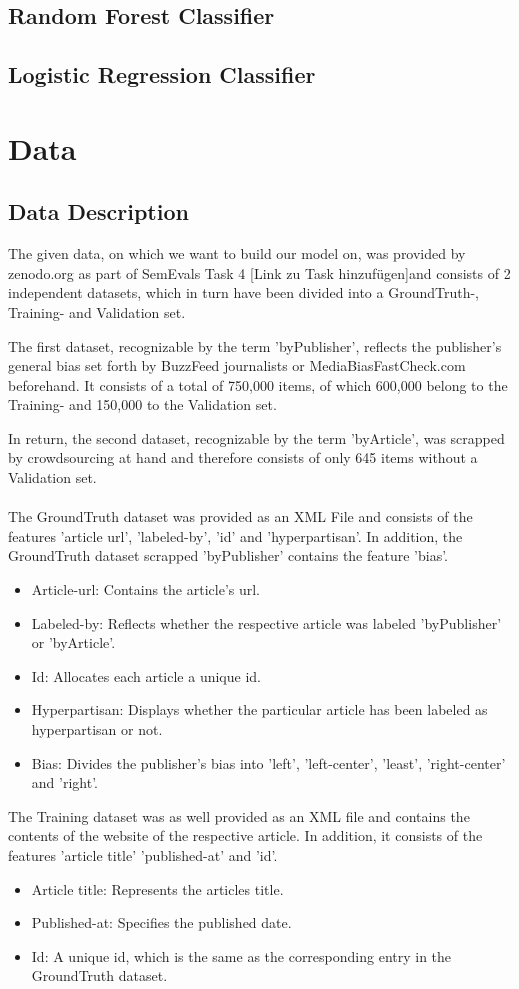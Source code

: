 \documentclass[a4paper, 11pt,titlepage,oneside,openany]{book}
\begin{document}
\section{Random Forest Classifier}
\section{Logistic Regression Classifier}


\chapter{Data}
\label{cha:theory}


\section{Data Description}
 The given data, on which we want to build our model on, was provided by zenodo.org as part of SemEvals Task 4 [Link zu Task hinzufügen]and consists of 2 independent datasets, which in turn have been divided into a GroundTruth-, Training- and Validation set.
 
 \noindent The first dataset, recognizable by the term 'byPublisher', reflects the publisher's general bias set forth by BuzzFeed journalists or MediaBiasFastCheck.com beforehand. It consists of a total of 750,000 items, of which 600,000 belong to the Training- and 150,000 to the Validation set.
 
 \noindent In return, the second dataset, recognizable by the term 'byArticle', was scrapped by crowdsourcing at hand and therefore consists of only 645 items without a Validation set.\\
 \\
 The GroundTruth dataset was provided as an XML File and consists of the features 'article url', 'labeled-by', 'id' and 'hyperpartisan'. In addition, the GroundTruth dataset scrapped 'byPublisher' contains the feature 'bias'.
\begin{itemize}
	\item Article-url: Contains the article's url.
	\item Labeled-by: Reflects whether the respective article was labeled 'byPublisher' or 'byArticle'.
	\item Id: Allocates each article a unique id.
	\item Hyperpartisan: Displays whether the particular article has been labeled as hyperpartisan or not.
	\item Bias: Divides the publisher's bias into 'left', 'left-center', 'least', 'right-center' and 'right'.
\end{itemize}
 The Training dataset was as well provided as an XML file and contains the contents of the website of the respective article. In addition, it consists of the features 'article title' 'published-at' and 'id'.
\begin{itemize}
	\item Article title: Represents the articles title.
	\item Published-at: Specifies the published date.
	\item Id: A unique id, which is the same as the corresponding entry in the GroundTruth dataset.
\end{itemize}
\end{document}
